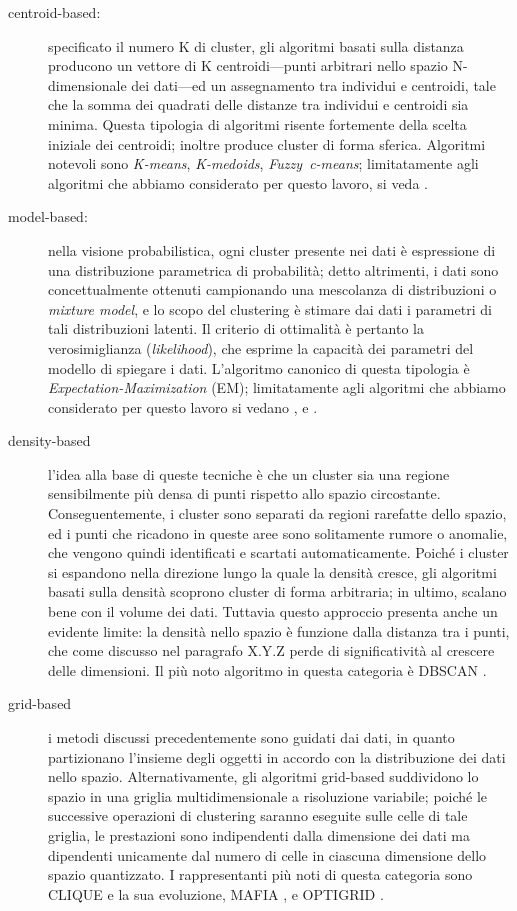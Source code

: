 \begin{description}
\item[centroid-based:] specificato il numero K di cluster, gli algoritmi basati sulla distanza producono un vettore di K centroidi---punti arbitrari nello spazio N-dimensionale dei dati---ed un assegnamento tra individui e centroidi, tale che la somma dei quadrati delle distanze tra individui e centroidi sia minima. Questa tipologia di algoritmi risente fortemente della scelta iniziale dei centroidi; inoltre produce cluster di forma sferica. Algoritmi notevoli sono \mbox{\textit{K-means}}, \mbox{\textit{K-medoids}}, \mbox{\textit{Fuzzy c-means}}; limitatamente agli algoritmi che abbiamo considerato per questo lavoro, si veda \cite{lac}.
\item[model-based:] nella visione probabilistica, ogni cluster presente nei dati \`e espressione di una distribuzione parametrica di probabilit\`a; detto altrimenti, i dati sono concettualmente ottenuti campionando una mescolanza di distribuzioni o \textit{mixture model}, e lo scopo del clustering \`e stimare dai dati i parametri di tali distribuzioni latenti. Il criterio di ottimalit\`a \`e pertanto la verosimiglianza (\textit{likelihood}), che esprime la capacit\`a dei parametri del modello di spiegare i dati. L'algoritmo canonico di questa tipologia \`e \textit{Expectation-Maximization} (EM); limitatamente agli algoritmi che abbiamo considerato per questo lavoro si vedano \cite{moc}, \cite{cesna} e \cite{handcock07}.
\item[density-based] l'idea alla base di queste tecniche \`e che un cluster sia una regione sensibilmente pi\`u densa di punti rispetto allo spazio circostante. Conseguentemente, i cluster sono separati da regioni rarefatte dello spazio, ed i punti che ricadono in queste aree sono solitamente rumore o anomalie, che vengono quindi identificati e scartati automaticamente. Poich\'e i cluster si espandono nella direzione lungo la quale la densit\`a cresce, gli algoritmi basati sulla densit\`a scoprono cluster di forma arbitraria; in ultimo, scalano bene con il volume dei dati. Tuttavia questo approccio presenta anche un evidente limite: la densit\`a nello spazio \`e funzione dalla distanza tra i punti, che come discusso nel paragrafo X.Y.Z perde di significativit\`a al crescere delle dimensioni. Il pi\`u noto algoritmo in questa categoria \`e DBSCAN \cite{dbscan}.
\item[grid-based] i metodi discussi precedentemente sono guidati dai dati, in quanto partizionano l'insieme degli oggetti in accordo con la distribuzione dei dati nello spazio. Alternativamente, gli algoritmi grid-based suddividono lo spazio in una griglia multidimensionale a risoluzione variabile; poich\'e le successive operazioni di clustering saranno eseguite sulle celle di tale griglia, le prestazioni sono indipendenti dalla dimensione dei dati ma dipendenti unicamente dal numero di celle in ciascuna dimensione dello spazio quantizzato. I rappresentanti pi\`u noti di questa categoria sono CLIQUE \cite{clique} e la sua evoluzione, MAFIA \cite{mafia}, e OPTIGRID \cite{optigrid}.
\end{description}

